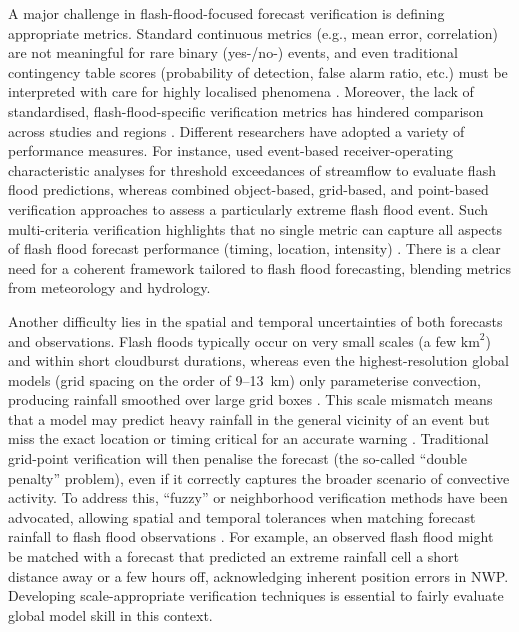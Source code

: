A major challenge in flash-flood-focused forecast verification is defining appropriate metrics. Standard continuous metrics (e.g., mean error, correlation) are not meaningful for rare binary (yes-/no-) events, and even traditional contingency table scores (probability of detection, false alarm ratio, etc.) must be interpreted with care for highly localised phenomena \citep{Hapuarachchi2011}. Moreover, the lack of standardised, flash-flood-specific verification metrics has hindered comparison across studies and regions \citep{CharpentierNoyer2023}. Different researchers have adopted a variety of performance measures. For instance, \citet{CharpentierNoyer2023} used event-based receiver-operating characteristic analyses for threshold exceedances of streamflow to evaluate flash flood predictions, whereas \citet{Viterbo2020} combined object-based, grid-based, and point-based verification approaches to assess a particularly extreme flash flood event. Such multi-criteria verification highlights that no single metric can capture all aspects of flash flood forecast performance (timing, location, intensity) \citep{Viterbo2020}. There is a clear need for a coherent framework tailored to flash flood forecasting, blending metrics from meteorology and hydrology.

Another difficulty lies in the spatial and temporal uncertainties of both forecasts and observations. Flash floods typically occur on very small scales (a few $\mathrm{km}^2$) and within short cloudburst durations, whereas even the highest-resolution global models (grid spacing on the order of 9--13~km) only parameterise convection, producing rainfall smoothed over large grid boxes \citep{Hewson2021}. This scale mismatch means that a model may predict heavy rainfall in the general vicinity of an event but miss the exact location or timing critical for an accurate warning \citep{Collier2007}. Traditional grid-point verification will then penalise the forecast (the so-called “double penalty” problem), even if it correctly captures the broader scenario of convective activity. To address this, “fuzzy” or neighborhood verification methods have been advocated, allowing spatial and temporal tolerances when matching forecast rainfall to flash flood observations \citep{CharpentierNoyer2023}. For example, an observed flash flood might be matched with a forecast that predicted an extreme rainfall cell a short distance away or a few hours off, acknowledging inherent position errors in NWP. Developing scale-appropriate verification techniques is essential to fairly evaluate global model skill in this context.


